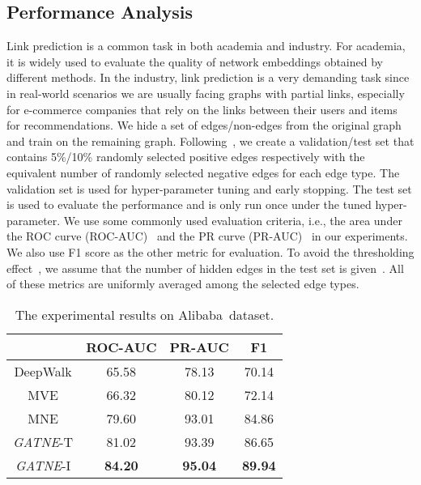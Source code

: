 \documentclass[sigconf]{acmart}
\newcommand{\company}{Alibaba}
\newcommand{\model}{{\em GATNE}}
\newcommand{\hide}[1]{} \newcommand{\jie}[1]{\textbf{\color{red}[(JT: #1 )]}}  \newcommand{\vpara}[1]{\vspace{0.07in}\noindent\textbf{#1 }}
\begin{document}
\subsection{Performance Analysis}
Link prediction is a common task in both academia and industry. For academia, it is widely used to evaluate the quality of network embeddings obtained by different methods. In the industry, link prediction is a very demanding task since in real-world scenarios we are usually facing graphs with partial links, especially for e-commerce companies that rely on the links between their users and items for recommendations. We hide a set of edges/non-edges from the original graph and train on the remaining graph. Following~\cite{kipf2016variational, bojchevski2018deep}, we create a validation/test set that contains 5\%/10\% randomly selected positive edges respectively with the equivalent number of randomly selected negative edges for each edge type. The validation set is used for hyper-parameter tuning and early stopping. The test set is used to evaluate the performance and is only run once under the tuned hyper-parameter. We use some commonly used evaluation criteria, i.e., the area under the ROC curve (ROC-AUC)~\cite{hanley1982meaning} and the PR curve (PR-AUC)~\cite{davis2006relationship} in our experiments. We also use F1 score as the other metric for evaluation. To avoid the thresholding effect~\cite{tang2009large}, we assume that the number of hidden edges in the test set is given~\cite{tang2009large, perozzi2014deepwalk, qiu2018network}. All of these metrics are uniformly averaged among the selected edge types. 

\begin{table}[t]
\centering
\caption{\label{tab:tab_online_res}The experimental results on \company\ dataset. \hide{We use \textbf{bold} to highlight methods that surpass all other compared methods.}} 
    \begin{tabular}{c|ccc}
        \hline \hline
        & ROC-AUC & PR-AUC & F1 \\
        \hline
        DeepWalk & 65.58 & 78.13 & 70.14\\
        MVE & 66.32 & 80.12 & 72.14\\
        MNE & 79.60 & 93.01 & 84.86\\ \model-T & 81.02 & 93.39 & 86.65 \\
        \model-I & \textbf{84.20} & \textbf{95.04} & \textbf{89.94} \\
        \hline \hline
    \end{tabular}
\end{table}
\end{document}
